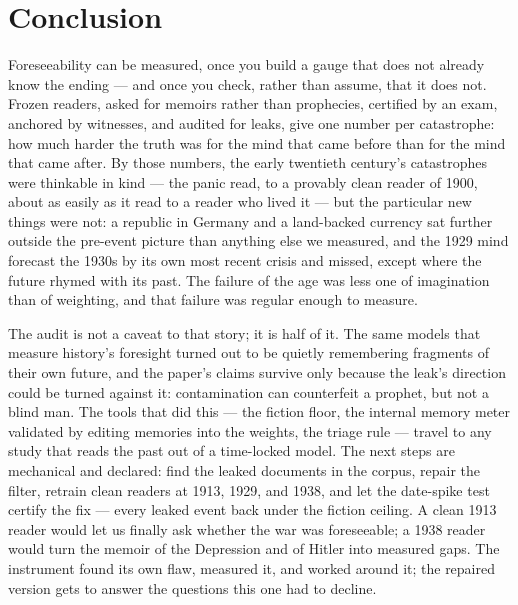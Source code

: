 \documentclass[11pt]{article}
\begin{document}
\section{Conclusion}\label{sec:conclusion}

Foreseeability can be measured, once you build a gauge that does not already know the ending --- and once
you check, rather than assume, that it does not. Frozen readers, asked for memoirs rather than prophecies,
certified by an exam, anchored by witnesses, and audited for leaks, give one number per catastrophe: how
much harder the truth was for the mind that came before than for the mind that came after. By those
numbers, the early twentieth century's catastrophes were thinkable in kind --- the panic read, to a
provably clean reader of 1900, about as easily as it read to a reader who lived it --- but the particular
new things were not: a republic in Germany and a land-backed currency sat further outside the pre-event
picture than anything else we measured, and the 1929 mind forecast the 1930s by its own most recent
crisis and missed, except where the future rhymed with its past. The failure of the age was less one of
imagination than of weighting, and that failure was regular enough to measure.

The audit is not a caveat to that story; it is half of it. The same models that measure history's
foresight turned out to be quietly remembering fragments of their own future, and the paper's claims
survive only because the leak's direction could be turned against it: contamination can counterfeit a
prophet, but not a blind man. The tools that did this --- the fiction floor, the internal memory meter
validated by editing memories into the weights, the triage rule --- travel to any study that reads the
past out of a time-locked model. The next steps are mechanical and declared: find the leaked documents in
the corpus, repair the filter, retrain clean readers at 1913, 1929, and 1938, and let the date-spike test
certify the fix --- every leaked event back under the fiction ceiling. A clean 1913 reader would let us
finally ask whether the war was foreseeable; a 1938 reader would turn the memoir of the Depression and of
Hitler into measured gaps. The instrument found its own flaw, measured it, and worked around it; the
repaired version gets to answer the questions this one had to decline.
\end{document}
